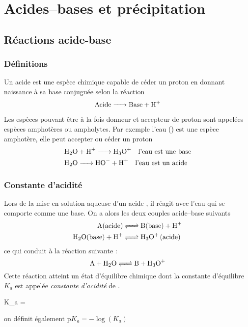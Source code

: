 \documentclass{cours}
\begin{document}
\setcounter{chapter}{11}
\chapter{Acides--bases et précipitation}

\section{Réactions acide-base}
\subsection{Définitions}%
\label{sub:definitions_acidebase}
\begin{definition}
  Un acide est une espèce chimique capable de céder un proton  en donnant naissance à sa base conjuguée selon la réaction
  \begin{equation}
    \text{Acide} \ce{->} \text{Base} + \ce{H+}
  \end{equation}
\end{definition}

Les  espèces pouvant être à la fois donneur et accepteur de proton sont appelées espèces amphotères ou ampholytes. Par exemple l'eau () est une espèce amphotère, elle peut accepter ou céder un proton
\begin{align}
  & \ce{H2O + H+ -> H3O+} \quad \text{l'eau est une base}\\
  & \ce{H2O -> HO- + H+} \quad \text{l'eau est un acide}
\end{align}

\subsection{Constante d'acidité}%
\label{sub:constante_d_acidite}

Lors de la mise en solution aqueuse d'un acide , il réagit avec l'eau qui se comporte comme une base. On a alors les deux couples acide--base suivants 
\begin{align}
  \ce{A(acide)} &\ce{<=>} \ce{B(base) + H+}\\
  \ce{H2O(base) + H+} &\ce{<=>} \ce{H3O+ (acide)}\\
\end{align}
ce qui conduit à la réaction suivante :
\begin{equation}
  \ce{A + H2O  <=> B + H3O+}
\end{equation}
Cette réaction atteint un état d'équilibre chimique dont la constante d'équilibre $K_a$ est appelée \emph{constante d'acidité} de . 
\begin{eqencadre}
  K_a =  
\end{eqencadre}
\newcommand{\pKa}{\mathrm{p}K_a}
on définit également $\pKa = -\log(K_a)$ 
\end{document}

